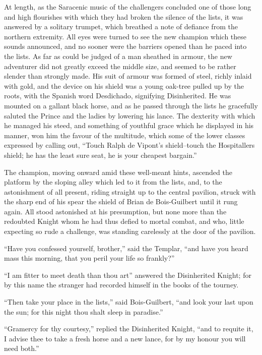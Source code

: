 At length, as the Saracenic music of the challengers concluded one of
those long and high flourishes with which they had broken the silence of
the lists, it was answered by a solitary trumpet, which breathed a note
of defiance from the northern extremity. All eyes were turned to see the
new champion which these sounds announced, and no sooner were the
barriers opened than he paced into the lists. As far as could be judged
of a man sheathed in armour, the new adventurer did not greatly exceed
the middle size, and seemed to be rather slender than strongly made. His
suit of armour was formed of steel, richly inlaid with gold, and the
device on his shield was a young oak-tree pulled up by the roots, with
the Spanish word Desdichado, signifying Disinherited. He was mounted on
a gallant black horse, and as he passed through the lists he gracefully
saluted the Prince and the ladies by lowering his lance. The dexterity
with which he managed his steed, and something of youthful grace which
he displayed in his manner, won him the favour of the multitude, which
some of the lower classes expressed by calling out, ``Touch Ralph de
Vipont's shield--touch the Hospitallers shield; he has the least sure
seat, he is your cheapest bargain.''

The champion, moving onward amid these well-meant hints, ascended the
platform by the sloping alley which led to it from the lists, and, to
the astonishment of all present, riding straight up to the central
pavilion, struck with the sharp end of his spear the shield of Brian de
Bois-Guilbert until it rung again. All stood astonished at his
presumption, but none more than the redoubted Knight whom he had thus
defied to mortal combat, and who, little expecting so rude a challenge,
was standing carelessly at the door of the pavilion.

``Have you confessed yourself, brother,'' said the Templar, ``and have
you heard mass this morning, that you peril your life so frankly?''

``I am fitter to meet death than thou art'' answered the Disinherited
Knight; for by this name the stranger had recorded himself in the books
of the tourney.

``Then take your place in the lists,'' said Bois-Guilbert, ``and look
your last upon the sun; for this night thou shalt sleep in paradise.''

``Gramercy for thy courtesy,'' replied the Disinherited Knight, ``and to
requite it, I advise thee to take a fresh horse and a new lance, for by
my honour you will need both.''

